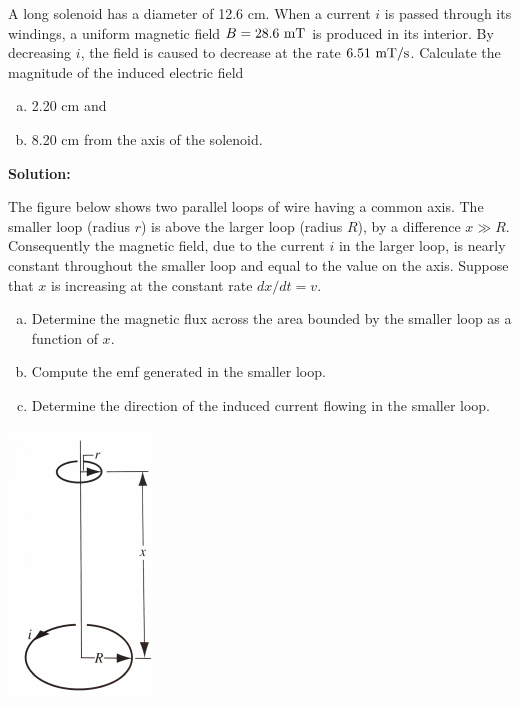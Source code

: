 \documentclass[11pt]{article}
\newcommand{\be}{\begin{enumerate}[a) ]}
\newcommand{\ee}{\end{enumerate}}
\begin{document}
\vspace*{0.25in}


\begin{problem}[(E34.30)]
A long solenoid has a diameter of 12.6 cm. When a current $i$ is passed through its windings, a
uniform magnetic field $B = 28.6~\mathrm{mT}$ is produced in its interior. By decreasing $i$, the field is caused
to decrease at the rate $6.51~\mathrm{mT/s}$. Calculate the magnitude of the induced electric field
\be
\item 2.20 cm and
\item 8.20 cm from the axis of the solenoid.
\ee
\end{problem}


\textbf{Solution:}\\

\clearpage

\begin{problem}[(P34.6)*]
The figure below shows two parallel loops of wire having a common axis. The smaller loop (radius $r$)
is above the larger loop (radius $R$), by a difference $x \gg R$. Consequently the magnetic field, due
to the current $i$ in the larger loop, is nearly constant throughout the smaller loop and equal to the
value on the axis. Suppose that $x$ is increasing at the constant rate $dx/dt = v$.
\be
\item Determine the magnetic flux across the area bounded by the smaller loop as a function of $x$.
\item Compute the emf generated in the smaller loop.
\item Determine the direction of the induced current flowing in the smaller loop.
\ee
\begin{center}
\includegraphics[scale=0.5]{prob2.png}
\end{center}
\end{problem}
\end{document}
